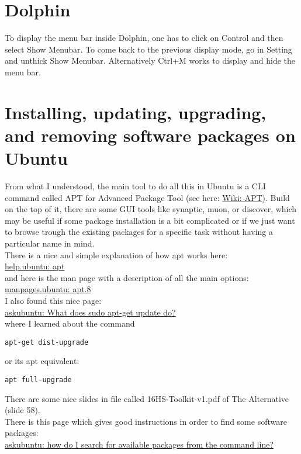 \documentclass[11pt,a4paper]{article} %
\begin{document}
\section{Dolphin}
To display the menu bar inside Dolphin, one has to click on Control and then select Show Menubar. To come back to the previous display mode, go in Setting and unthick Show Menubar. Alternatively Ctrl+M works to display and hide the menu bar.

\section{Installing, updating, upgrading, and removing software packages on Ubuntu}
From what I understood, the main tool to do all this in Ubuntu is a CLI command called APT for Advanced Package Tool (see here: \href{https://en.wikipedia.org/wiki/APT_(Debian)}{Wiki: APT}). Build on the top of it, there are some GUI tools like synaptic, muon, or discover, which may be useful if some package installation is a bit complicated or if we just want to browse trough the existing packages for a specific task without having a particular name in mind.\\

There is a nice and simple explanation of how apt works here:\\
\href{https://help.ubuntu.com/lts/serverguide/apt.html}{help.ubuntu: apt}\\
and here is the man page with a description of all the main options:\\
\href{http://manpages.ubuntu.com/manpages/zesty/man8/apt.8.html}{manpages.ubuntu: apt.8}\\
I also found this nice page:\\
\href{https://askubuntu.com/questions/222348/what-does-sudo-apt-get-update-do#222352}{askubuntu: What does sudo apt-get update do?}\\
where I learned about the command
\begin{verbatim}
apt-get dist-upgrade
\end{verbatim}
or its apt equivalent:
\begin{verbatim}
apt full-upgrade
\end{verbatim}
There are some nice slides in file called 16HS-Toolkit-v1.pdf of The Alternative (slide 58).\\

There is this page which gives good instructions in order to find some software packages:\\
\href{https://askubuntu.com/questions/160897/how-do-i-search-for-available-packages-from-the-command-line}{askubuntu: how do I search for available packages from the command line?}\\
\end{document}
